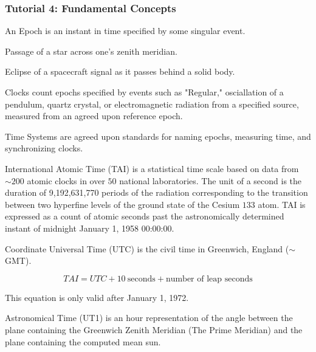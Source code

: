 \documentclass[crop=false,class=book]{standalone}
\begin{document}
\subsubsection{Tutorial 4: Fundamental Concepts}
\begin{definition}
An Epoch is an instant in time specified by some singular event.
\end{definition}
\begin{example}
Passage of a star across one's zenith meridian.
\end{example}
\begin{example}
Eclipse of a spacecraft signal as it passes behind a solid body.
\end{example}
\begin{remark}
Clocks count epochs specified by events such as "Regular," osciallation of a pendulum, quartz crystal, or electromagnetic radiation from a specified source, measured from an agreed upon reference epoch.
\end{remark}
\begin{definition}
Time Systems are agreed upon standards for naming epochs, measuring time, and synchronizing clocks.
\end{definition}
\begin{definition}
International Atomic Time (TAI) is a statistical time scale based on data from $\sim200$ atomic clocks in over $50$ national laboratories. The unit of a second is the duration of 9,192,631,770 periods of the radiation corresponding to the transition between two hyperfine levels of the ground state of the Cesium $133$ atom. TAI is expressed as a count of atomic seconds past the astronomically determined instant of midnight January 1, 1958 00:00:00.
\end{definition}
\begin{definition}
Coordinate Universal Time (UTC) is the civil time in Greenwich, England ($\sim$GMT).
\end{definition}
\begin{equation}
TAI=UTC+10\ \textrm{seconds}+\textrm{number of leap seconds}
\end{equation}
\begin{remark}
This equation is only valid after January 1, 1972.
\end{remark}
\begin{definition}
Astronomical Time (UT1) is an hour representation of the angle between the plane containing the Greenwich Zenith Meridian (The Prime Meridian) and the plane containing the computed mean sun.
\end{definition}
\end{document}
